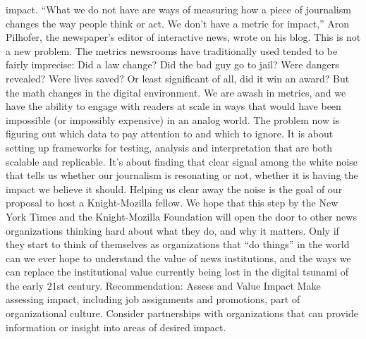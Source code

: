 impact. ``What we do not have are ways of measuring how a piece of journalism
changes the way people think or act. We don’t have a metric for impact,'' Aron
Pilhofer, the newspaper’s editor of interactive news, wrote on his blog.
This is not a new problem. The metrics newsrooms have traditionally
used tended to be fairly imprecise: Did a law change? Did the bad guy
go to jail? Were dangers revealed? Were lives saved? Or least significant
of all, did it win an award?
But the math changes in the digital environment. We are awash in
metrics, and we have the ability to engage with readers at scale in
ways that would have been impossible (or impossibly expensive) in an
analog world.
The problem now is figuring out which data to pay attention to and
which to ignore. It is about setting up frameworks for testing, analysis
and interpretation that are both scalable and replicable.
It’s about finding that clear signal among the white noise that tells us
whether our journalism is resonating or not, whether it is having the
impact we believe it should. Helping us clear away the noise is the goal
of our proposal to host a Knight-Mozilla fellow.
We hope that this step by the New York Times and the Knight-Mozilla Foundation
will open the door to other news organizations thinking hard about what
they do, and why it matters. Only if they start to think of themselves as organizations
that ``do things'' in the world can we ever hope to understand the value of
news institutions, and the ways we can replace the institutional value currently
being lost in the digital tsunami of the early 21st century.
Recommendation: Assess and Value Impact
Make assessing impact, including job assignments and promotions, part
of organizational culture. Consider partnerships with organizations that
can provide information or insight into areas of desired impact.

